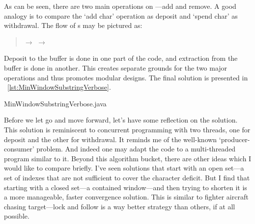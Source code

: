 As can be seen, there are two main operations on ---add and remove.
A good analogy is to compare the `add char' operation as deposit and `spend char' as withdrawal.
The flow of s may be pictured as:
\begin{quote}
     $\rightarrow$  $\rightarrow$ 
\end{quote}
Deposit to the buffer is done in one part of the code, and extraction from the buffer is done in
another.
This creates separate grounds for the two major operations and thus promotes modular designs.
The final solution is presented in ~\autoref{lst:MinWindowSubstringVerbose}.


{MinWindowSubstringVerbose.java}

Before we let go and move forward, let's have some reflection on the solution.
This solution is reminiscent to concurrent programming with two threads, one for deposit
and the other for withdrawal.
It reminds me of the well-known `producer-consumer' problem.
And indeed one may adapt the code to a multi-threaded program similar to it.
Beyond this algorithm bucket, there are other ideas which I would like to compare briefly.
I've seen solutions that start with an open set---a set of indexes that are not
sufficient to cover the character deficit.
But I find that starting with a closed set---a contained window---and then trying
to shorten it is a more manageable, faster convergence solution.
This is similar to fighter aircraft chasing target---lock and follow is a way better strategy
than others, if at all possible.

